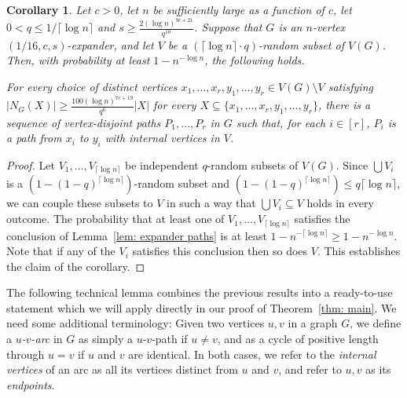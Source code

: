 \documentclass[11pt,reqno]{article}
\newtheorem{corollary}[theorem]{Corollary}
\begin{document}
\begin{corollary}\label{cor: expander paths}
    Let $c > 0$, let $n$ be sufficiently large as a function of $c$, let $0 < q \leq 1/\lceil\log n\rceil$ and $s\ge \frac{2 (\log n)^{9c+21}}{q^{10}}$. Suppose that $G$ is an $n$-vertex $(1/16, c, s)$-expander, and let $V$ be a $(\lceil\log n\rceil\cdot q)$-random subset of $V(G)$. Then, with probability at least $1 - n^{-\log n}$, the following holds.

    For every choice of distinct vertices $x_1, \ldots, x_r, y_1, \ldots, y_r\in V(G)\setminus V$ satisfying $|N_G(X)| \ge \frac{100 (\log n)^{7c+19}}{q^6}|X|$ for every $X \subseteq \{x_1, \ldots, x_r, y_1, \ldots, y_r\}$, there is a sequence of vertex-disjoint paths $P_1, \ldots, P_r$ in $G$ such that, for each $i \in [r]$, $P_i$ is a path from $x_i$ to $y_i$ with internal vertices in $V$.
\end{corollary}
\begin{proof}
    Let $V_1,\ldots,V_{\lceil\log n\rceil}$ be independent $q$-random subsets of $V(G)$. Since $\bigcup V_i$ is a $(1-(1-q)^{\lceil\log n\rceil})$-random subset and $(1-(1-q)^{\lceil\log n\rceil})\le q \lceil\log n\rceil$, we can couple these subsets to $V$ in such a way that $\bigcup V_i\subseteq V$ holds in every outcome. The probability that at least one of $V_1,\ldots,V_{\lceil \log n\rceil}$ satisfies the conclusion of Lemma~\ref{lem: expander paths} is at least $1-n^{-\lceil\log n\rceil}\ge 1-n^{-\log n}$. Note that if any of the $V_i$ satisfies this conclusion then so does $V$. This establishes the claim of the corollary.
\end{proof}
The following technical lemma combines the previous results into a ready-to-use statement which we will apply directly in our proof of Theorem~\ref{thm: main}. We need some additional terminology: Given two vertices $u,v$ in a graph $G$, we define a \emph{$u$-$v$-arc} in $G$ as simply a $u$-$v$-path if $u\neq v$, and as a cycle of positive length through $u=v$ if $u$ and $v$ are identical. In both cases, we refer to the \emph{internal vertices} of an arc as all its vertices distinct from $u$ and $v$, and refer to $u,v$ as its \emph{endpoints}.
\end{document}
